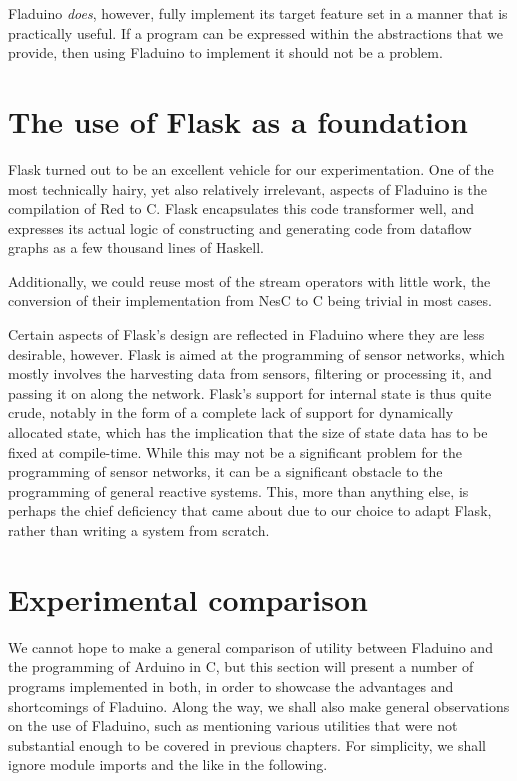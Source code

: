 \documentclass[a4paper, oneside, final]{memoir}
\begin{document}
\noindent
Fladuino \textit{does}, however, fully implement its target feature
set in a manner that is practically useful.  If a program can be
expressed within the abstractions that we provide, then using Fladuino
to implement it should not be a problem.

\section{The use of Flask as a foundation}

Flask turned out to be an excellent vehicle for our experimentation.
One of the most technically hairy, yet also relatively irrelevant,
aspects of Fladuino is the compilation of Red to C.  Flask
encapsulates this code transformer well, and expresses its actual
logic of constructing and generating code from dataflow graphs as a
few thousand lines of Haskell.

Additionally, we could reuse most of the stream operators with little
work, the conversion of their implementation from NesC to C being
trivial in most cases.

Certain aspects of Flask's design are reflected in Fladuino where they
are less desirable, however.  Flask is aimed at the programming of
sensor networks, which mostly involves the harvesting data from
sensors, filtering or processing it, and passing it on along the
network.  Flask's support for internal state is thus quite crude,
notably in the form of a complete lack of support for dynamically
allocated state, which has the implication that the size of state data
has to be fixed at compile-time.  While this may not be a significant
problem for the programming of sensor networks, it can be a
significant obstacle to the programming of general reactive systems.
This, more than anything else, is perhaps the chief deficiency that
came about due to our choice to adapt Flask, rather than writing a
system from scratch.

\section{Experimental comparison}

We cannot hope to make a general comparison of utility between
Fladuino and the programming of Arduino in C, but this section will
present a number of programs implemented in both, in order to showcase
the advantages and shortcomings of Fladuino.  Along the way, we shall
also make general observations on the use of Fladuino, such as
mentioning various utilities that were not substantial enough to be
covered in previous chapters.  For simplicity, we shall ignore module
imports and the like in the following.
\end{document}
